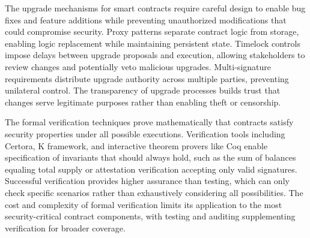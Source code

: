 The upgrade mechanisms for smart contracts require careful design to enable bug fixes and feature additions while preventing unauthorized modifications that could compromise security. Proxy patterns separate contract logic from storage, enabling logic replacement while maintaining persistent state. Timelock controls impose delays between upgrade proposals and execution, allowing stakeholders to review changes and potentially veto malicious upgrades. Multi-signature requirements distribute upgrade authority across multiple parties, preventing unilateral control. The transparency of upgrade processes builds trust that changes serve legitimate purposes rather than enabling theft or censorship.

The formal verification techniques prove mathematically that contracts satisfy security properties under all possible executions. Verification tools including Certora, K framework, and interactive theorem provers like Coq enable specification of invariants that should always hold, such as the sum of balances equaling total supply or attestation verification accepting only valid signatures. Successful verification provides higher assurance than testing, which can only check specific scenarios rather than exhaustively considering all possibilities. The cost and complexity of formal verification limits its application to the most security-critical contract components, with testing and auditing supplementing verification for broader coverage.